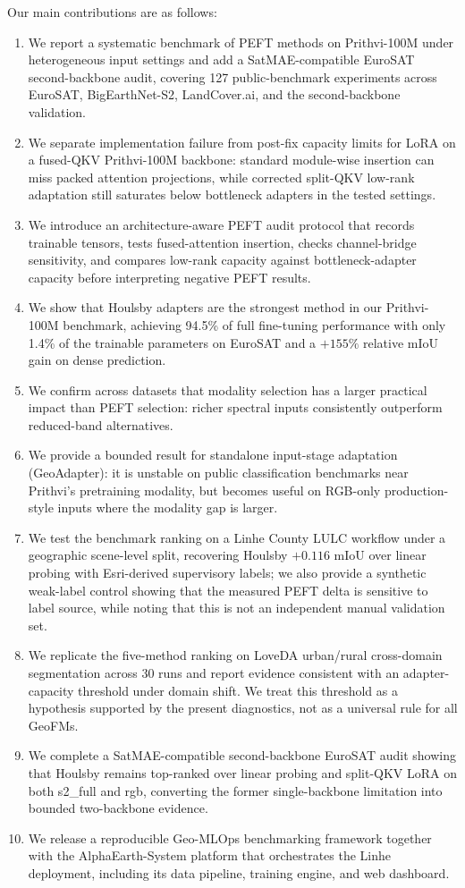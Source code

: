 \documentclass[11pt]{article}
\begin{document}
Our main contributions are as follows:
\begin{enumerate}[leftmargin=1.5em]
    \item We report a systematic benchmark of PEFT methods on Prithvi-100M under heterogeneous input settings and add a SatMAE-compatible EuroSAT second-backbone audit, covering 127 public-benchmark experiments across EuroSAT, BigEarthNet-S2, LandCover.ai, and the second-backbone validation.
    \item We separate implementation failure from post-fix capacity limits for LoRA on a fused-QKV Prithvi-100M backbone: standard module-wise insertion can miss packed attention projections, while corrected split-QKV low-rank adaptation still saturates below bottleneck adapters in the tested settings.
    \item We introduce an architecture-aware PEFT audit protocol that records trainable tensors, tests fused-attention insertion, checks channel-bridge sensitivity, and compares low-rank capacity against bottleneck-adapter capacity before interpreting negative PEFT results.
    \item We show that Houlsby adapters are the strongest method in our Prithvi-100M benchmark, achieving 94.5\% of full fine-tuning performance with only 1.4\% of the trainable parameters on EuroSAT and a $+155\%$ relative mIoU gain on dense prediction.
    \item We confirm across datasets that modality selection has a larger practical impact than PEFT selection: richer spectral inputs consistently outperform reduced-band alternatives.
    \item We provide a bounded result for standalone input-stage adaptation (GeoAdapter): it is unstable on public classification benchmarks near Prithvi's pretraining modality, but becomes useful on RGB-only production-style inputs where the modality gap is larger.
    \item We test the benchmark ranking on a Linhe County LULC workflow under a geographic scene-level split, recovering Houlsby $+0.116$ mIoU over linear probing with Esri-derived supervisory labels; we also provide a synthetic weak-label control showing that the measured PEFT delta is sensitive to label source, while noting that this is not an independent manual validation set.
    \item We replicate the five-method ranking on LoveDA urban/rural cross-domain segmentation across 30 runs and report evidence consistent with an adapter-capacity threshold under domain shift. We treat this threshold as a hypothesis supported by the present diagnostics, not as a universal rule for all GeoFMs.
    \item We complete a SatMAE-compatible second-backbone EuroSAT audit showing that Houlsby remains top-ranked over linear probing and split-QKV LoRA on both s2\_full and rgb, converting the former single-backbone limitation into bounded two-backbone evidence.
    \item We release a reproducible Geo-MLOps benchmarking framework together with the AlphaEarth-System platform that orchestrates the Linhe deployment, including its data pipeline, training engine, and web dashboard.
\end{enumerate}
\end{document}

